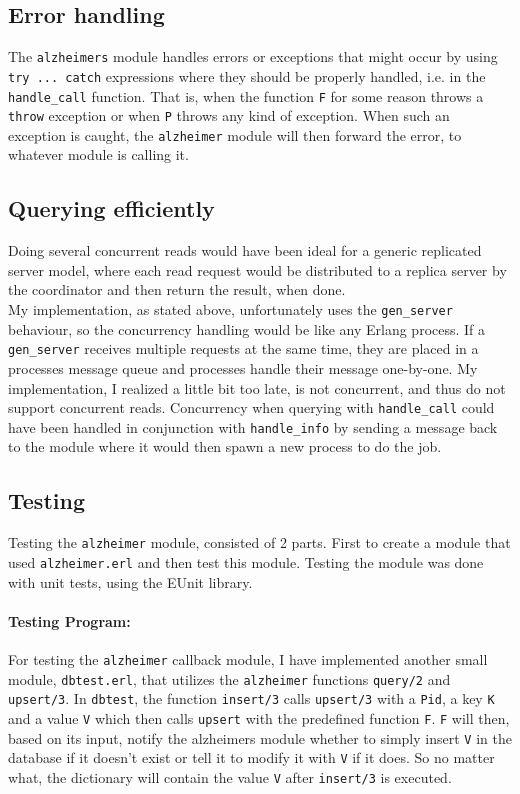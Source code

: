 \documentclass[a4paper]{article}
\begin{document}
\subsection{Error handling}
\label{sub:Error handling}
The \texttt{alzheimers} module handles errors or exceptions that might occur by using \texttt{try ... catch} expressions where they should be properly handled, i.e. in the \texttt{handle\_call} function. That is, when the function \texttt{F} for some reason throws a \texttt{throw} exception or when \texttt{P} throws any kind of exception. When such an exception is caught, the \texttt{alzheimer} module will then forward the error, to whatever module is calling it.
\subsection{Querying efficiently}
\label{sub:Querying efficiently}
Doing several concurrent reads would have been ideal for a generic replicated server model, where each read request would be distributed to a replica server by the coordinator and then return the result, when done.\\
My implementation, as stated above, unfortunately uses the \texttt{gen\_server} behaviour, so the concurrency handling would be like any Erlang process. If a \texttt{gen\_server} receives multiple requests at the same time, they are placed in a processes message queue and processes handle their message one-by-one. My implementation, I realized a little bit too late, is not concurrent, and thus do not support concurrent reads. Concurrency when querying with \texttt{handle\_call} could have been
handled in conjunction with \texttt{handle\_info} by sending a message back to the module where it would then spawn a new process to do the job.
\subsection{Testing}
\label{sub:Testing_alz}
Testing the \texttt{alzheimer} module, consisted of 2 parts. First to create a module that used \texttt{alzheimer.erl} and then test this module. Testing the module was done with unit tests, using the EUnit library.
\paragraph{Testing Program:}
\label{par:Testing Program}
For testing the \texttt{alzheimer} callback module, I have implemented another small module, \texttt{dbtest.erl}, that utilizes the \texttt{alzheimer} functions \texttt{query/2} and \texttt{upsert/3}. In \texttt{dbtest}, the function \texttt{insert/3} calls \texttt{upsert/3} with a \texttt{Pid}, a key \texttt{K} and a value \texttt{V} which then calls \texttt{upsert} with the predefined function \texttt{F}. \texttt{F} will then, based on its input, notify the alzheimers module whether to
simply insert \texttt{V} in the database if it doesn't exist or tell it to modify it with \texttt{V} if it does. So no matter what, the dictionary will contain the value \texttt{V} after \texttt{insert/3} is executed.
\end{document}
